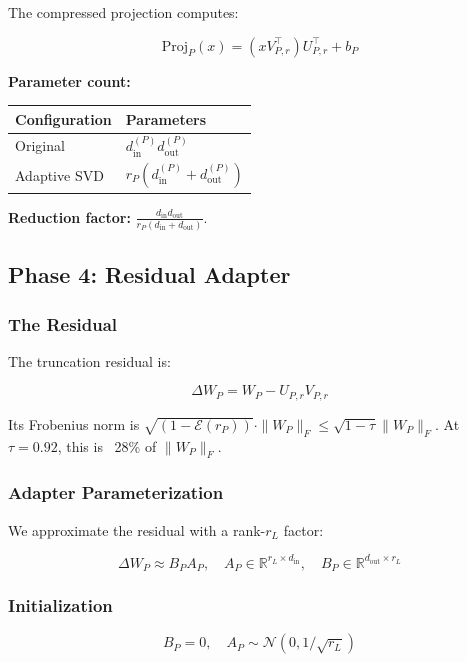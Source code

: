 The compressed projection computes:

\[
\text{Proj}_P(x) = (x V_{P, r}^\top) U_{P, r}^\top + b_P
\tag{4.5}
\]

\textbf{Parameter count:}

\begin{table}[H]
\centering
\small
\begin{tabular}{ll}
\toprule
\textbf{Configuration} & \textbf{Parameters} \\
\midrule
Original & $d_\text{in}^{(P)} d_\text{out}^{(P)}$ \\
Adaptive SVD & $r_P (d_\text{in}^{(P)} + d_\text{out}^{(P)})$ \\
\bottomrule
\end{tabular}
\end{table}

\textbf{Reduction factor:} $\frac{d_\text{in} d_\text{out}}{r_P (d_\text{in} + d_\text{out})}$.

\subsection{Phase 4: Residual Adapter}

\subsubsection{The Residual}

The truncation residual is:

\[
\Delta W_P = W_P - U_{P, r} V_{P, r}
\tag{4.6}
\]

Its Frobenius norm is $\sqrt{(1 - \mathcal{E}(r_P))} \cdot \|W_P\|_F \leq \sqrt{1 - \tau} \|W_P\|_F$. 
At $\tau = 0.92$, this is ~28\% of $\|W_P\|_F$.

\subsubsection{Adapter Parameterization}

We approximate the residual with a rank-$r_L$ factor:

\[
\Delta W_P \approx B_P A_P, \quad
A_P \in \mathbb{R}^{r_L \times d_\text{in}}, \quad
B_P \in \mathbb{R}^{d_\text{out} \times r_L}
\tag{4.7}
\]

\subsubsection{Initialization}

\[
B_P = 0, \quad A_P \sim \mathcal{N}(0, 1/\sqrt{r_L})
\tag{4.8}
\]

